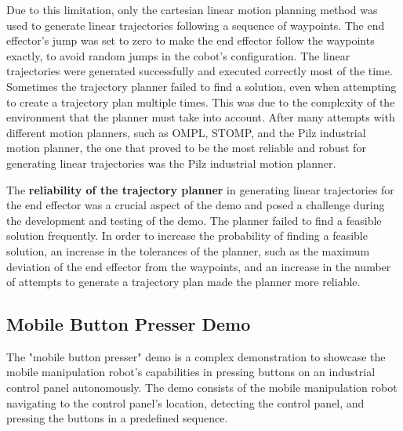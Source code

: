 Due to this limitation, only the cartesian linear motion planning method was used to generate linear trajectories
following a sequence of waypoints. The end effector's jump was set to zero to make the end effector follow
the waypoints exactly, to avoid random jumps in the cobot's configuration. The linear trajectories were
generated successfully and executed correctly most of the time. Sometimes the trajectory planner failed
to find a solution, even when attempting to create a trajectory plan multiple times. This was due to the
complexity of the environment that the planner must take into account. After many attempts with 
different motion planners, such as OMPL, STOMP, and the Pilz industrial motion planner, the one that
proved to be the most reliable and robust for generating linear trajectories was the Pilz industrial motion planner.

The \textbf{reliability of the trajectory planner} in generating linear trajectories for the end effector
was a crucial aspect of the demo and posed a challenge during the development and testing of the demo.
The planner failed to find a feasible solution frequently. In order to increase the probability of finding
a feasible solution, an increase in the tolerances of the planner, such as the maximum deviation
of the end effector from the waypoints, and an increase in the number of attempts to generate a trajectory plan
made the planner more reliable.

\subsection{Mobile Button Presser Demo}

The "mobile button presser" demo is a complex demonstration to showcase the mobile manipulation robot's
capabilities in pressing buttons on an industrial control panel autonomously. The demo consists of the mobile
manipulation robot navigating to the control panel's location, detecting the control panel, and pressing the buttons
in a predefined sequence.


